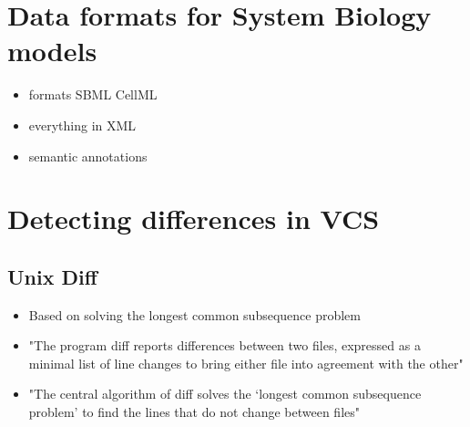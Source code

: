 \section{Data formats for System Biology models}
	\begin{itemize}
		\item formats
		\subitem SBML
		\subitem CellML
		\subitem \sedml
		\item everything in XML
		\item semantic annotations
	\end{itemize}

\section{Detecting differences in VCS}
	\subsection{Unix Diff}
	\begin{itemize}
		\item Based on solving the longest common subsequence problem
		\item "The program diff reports differences between two files, expressed as a minimal list of line changes to bring either file into agreement with the other" \cite{Hunt1976}
		\item "The central algorithm of diff solves the ‘longest common subsequence problem’ to find the lines that do not change between files" \cite{Hunt1976}
	\end{itemize}
	
